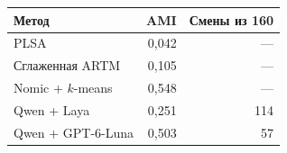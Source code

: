 \begin{tabular}{lrr}\toprule
Метод & AMI & Смены из 160\\\midrule
PLSA & 0,042 & ---\\
Сглаженная ARTM & 0,105 & ---\\
Nomic + $k$-means & 0,548 & ---\\
Qwen + Laya & 0,251 & 114\\
Qwen + GPT-6-Luna & 0,503 & 57\\
\bottomrule\end{tabular}
